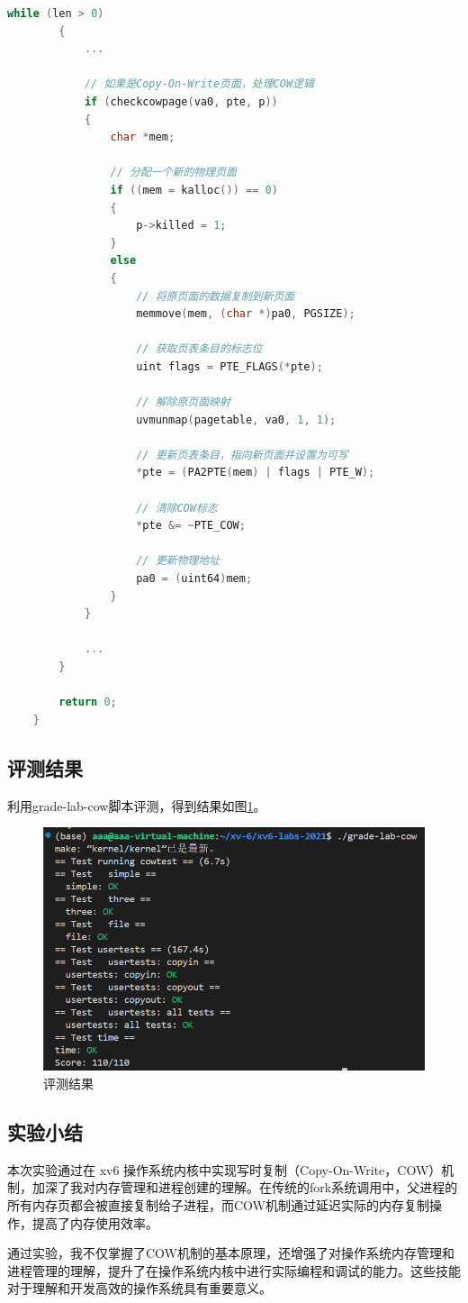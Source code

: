 \begin{enumerate}
\begin{lstlisting}[language=c,title=对copyout函数的修改]
        while (len > 0)
        {
            ...

            // 如果是Copy-On-Write页面，处理COW逻辑
            if (checkcowpage(va0, pte, p))
            {
                char *mem;

                // 分配一个新的物理页面
                if ((mem = kalloc()) == 0)
                {
                    p->killed = 1;
                }
                else
                {
                    // 将原页面的数据复制到新页面
                    memmove(mem, (char *)pa0, PGSIZE);

                    // 获取页表条目的标志位
                    uint flags = PTE_FLAGS(*pte);

                    // 解除原页面映射
                    uvmunmap(pagetable, va0, 1, 1);

                    // 更新页表条目，指向新页面并设置为可写
                    *pte = (PA2PTE(mem) | flags | PTE_W);

                    // 清除COW标志
                    *pte &= ~PTE_COW;

                    // 更新物理地址
                    pa0 = (uint64)mem;
                }
            }

            ...
        }

        return 0;
    }
    \end{lstlisting}
\end{enumerate}

\subsection{评测结果}
利用grade-lab-cow脚本评测，得到结果如图\ref{fig:cow}。
\begin{figure}[h]
    \centering
    \includegraphics[width=\linewidth]{pics/cow评测结果.png}
    \caption{评测结果}
    \label{fig:cow}
\end{figure}

\subsection{实验小结}
本次实验通过在 xv6 操作系统内核中实现写时复制（Copy-On-Write，COW）机制，加深了我对内存管理和进程创建的理解。在传统的fork系统调用中，父进程的所有内存页都会被直接复制给子进程，而COW机制通过延迟实际的内存复制操作，提高了内存使用效率。

通过实验，我不仅掌握了COW机制的基本原理，还增强了对操作系统内存管理和进程管理的理解，提升了在操作系统内核中进行实际编程和调试的能力。这些技能对于理解和开发高效的操作系统具有重要意义。

